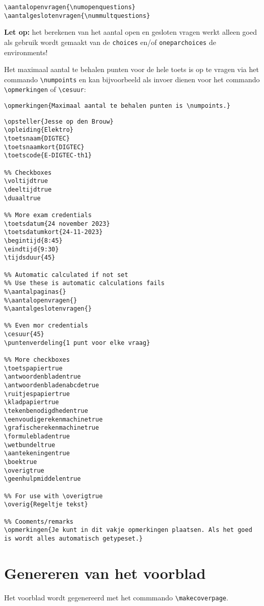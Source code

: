 \documentclass[12pt,dutch,addpoints,fleqn]{tisdexam}
\begin{document}
\verb|\aantalopenvragen{\numopenquestions}| \\
\verb|\aantalgeslotenvragen{\nummultquestions}|

\textbf{Let op:} het berekenen van het aantal open en gesloten vragen werkt alleen goed als gebruik wordt gemaakt van de \verb|choices| en/of \verb|oneparchoices| de environments!

Het maximaal aantal te behalen punten voor de hele toets is op te vragen via het commando
\verb|\numpoints| en kan bijvoorbeeld als invoer dienen voor het commando \verb|\opmerkingen| of
\verb|\cesuur|:

\verb|\opmerkingen{Maximaal aantal te behalen punten is \numpoints.}|

\newpage

\begin{lstlisting}
\opsteller{Jesse op den Brouw}
\opleiding{Elektro}
\toetsnaam{DIGTEC}
\toetsnaamkort{DIGTEC}
\toetscode{E-DIGTEC-th1}

%% Checkboxes
\voltijdtrue
\deeltijdtrue
\duaaltrue

%% More exam credentials
\toetsdatum{24 november 2023}
\toetsdatumkort{24-11-2023}
\begintijd{8:45}
\eindtijd{9:30}
\tijdsduur{45}

%% Automatic calculated if not set
%% Use these is automatic calculations fails
%\aantalpaginas{}
%\aantalopenvragen{}
%\aantalgeslotenvragen{}

%% Even mor credentials
\cesuur{45}
\puntenverdeling{1 punt voor elke vraag}

%% More checkboxes
\toetspapiertrue
\antwoordenbladentrue
\antwoordenbladenabcdetrue
\ruitjespapiertrue
\kladpapiertrue
\tekenbenodigdhedentrue
\eenvoudigerekenmachinetrue
\grafischerekenmachinetrue
\formulebladentrue
\wetbundeltrue
\aantekeningentrue
\boektrue
\overigtrue
\geenhulpmiddelentrue

%% For use with \overigtrue
\overig{Regeltje tekst}

%% Cooments/remarks
\opmerkingen{Je kunt in dit vakje opmerkingen plaatsen. Als het goed is wordt alles automatisch getypeset.}
\end{lstlisting}

\section{Genereren van het voorblad}

Het voorblad wordt gegenereerd met het commmando \verb|\makecoverpage|.
%
%
\end{document}
